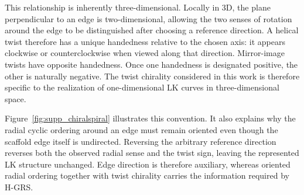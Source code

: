 \documentclass[acmtog]{acmart}
\begin{document}
This relationship is inherently three-dimensional. Locally in 3D, the plane perpendicular to an edge is two-dimensional, allowing the two senses of rotation around the edge to be distinguished after choosing a reference direction. A helical twist therefore has a unique handedness relative to the chosen axis: it appears clockwise or counterclockwise when viewed along that direction. Mirror-image twists have opposite handedness. Once one handedness is designated positive, the other is naturally negative.
The twist chirality considered in this work is therefore specific to the realization of one-dimensional LK curves in three-dimensional space.

Figure~\ref{fig:supp_chiralspiral} illustrates this convention. It also explains why the radial cyclic ordering around an edge must remain oriented even though the scaffold edge itself is undirected. Reversing the arbitrary reference direction reverses both the observed radial sense and the twist sign, leaving the represented LK structure unchanged. Edge direction is therefore auxiliary, whereas oriented radial ordering together with twist chirality carries the information required by H-GRS.
\end{document}
